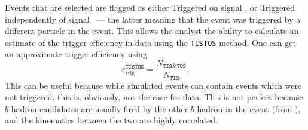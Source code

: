 Events that are selected are flagged as either
Triggered on signal \tos, or
Triggered independently of signal \tis~--- the latter meaning that the event was triggered by
a different particle in the event.
This allows the analyst the ability to calculate an estimate of the trigger efficiency in data
using the {\tt TISTOS} method.
One can get an approximate trigger efficiency using
\begin{equation}
  \varepsilon_\mathrm{trig}^\mathtt{TISTOS} =
  \frac {N_\mathtt{TIS\&TOS}} {N_\mathtt{TIS}}.
\end{equation}
This can be useful because while simulated events can contain events which were not triggered, this
is, obviously, not the case for data.
This is not perfect because \tis $b$-hadron candidates are usually fired by the other $b$-hadron
in the event (from ), and the kinematics between the two are highly correlated.



